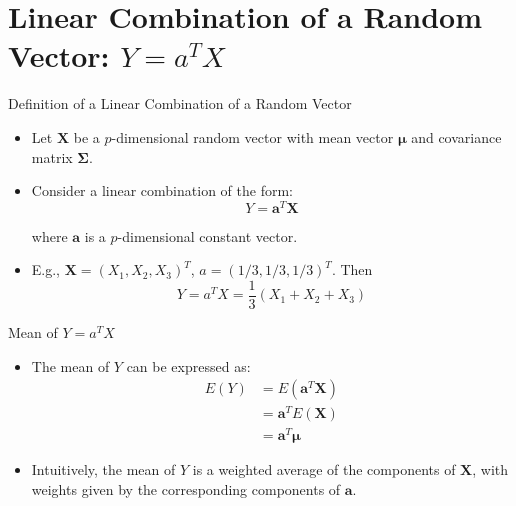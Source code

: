 \documentclass[
  ignorenonframetext,
]{beamer}
\begin{document}
\hypertarget{linear-combination-of-a-random-vector-yatx}{%
\section{\texorpdfstring{Linear Combination of a Random Vector:
\(Y=a^TX\)}{Linear Combination of a Random Vector: Y=a\^{}TX}}\label{linear-combination-of-a-random-vector-yatx}}

\begin{frame}{Definition of a Linear Combination of a Random Vector}
\protect\hypertarget{definition-of-a-linear-combination-of-a-random-vector}{}
\begin{itemize}
\item
  Let \(\mathbf{X}\) be a \(p\)-dimensional random vector with mean
  vector \(\boldsymbol{\mu}\) and covariance matrix
  \(\boldsymbol{\Sigma}\).
\item
  Consider a linear combination of the form:
  \[  Y = \mathbf{a}^T\mathbf{X}\]

  where \(\mathbf{a}\) is a \(p\)-dimensional constant vector.
\item
  E.g., \(\mathbf X = (X_1, X_2, X_3)^T\), \(a=(1/3, 1/3, 1/3)^T\). Then
  \[Y=a^TX=\frac{1}{3}(X_1 + X_2 + X_3)\]
\end{itemize}
\end{frame}

\begin{frame}{Mean of \(Y=a^TX\)}
\protect\hypertarget{mean-of-yatx}{}
\begin{itemize}
\item
  The mean of \(Y\) can be expressed as: \[
  \begin{aligned}
  E(Y) &= E(\mathbf{a}^T\mathbf{X}) \\
  &= \mathbf{a}^T E(\mathbf{X}) \\
  &= \mathbf{a}^T \boldsymbol{\mu}
  \end{aligned}
  \]
\item
  Intuitively, the mean of \(Y\) is a weighted average of the components
  of \(\mathbf{X}\), with weights given by the corresponding components
  of \(\mathbf{a}\).
\end{itemize}
\end{frame}
\end{document}

